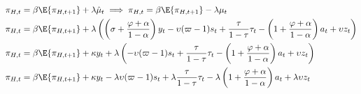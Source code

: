 

\begin{align}
    \pi_{H,t} &= \beta \E \{\pi_{H,t+1}\} + \lambda \hat{\mu}_t \implies \pi_{H,t} = \beta \E \{\pi_{H,t+1}\} - \lambda \mu_t \\
    \pi_{H,t} &= \beta \E \{\pi_{H,t+1}\} + \lambda \left(\left(\sigma + \frac{\varphi + \alpha}{1-\alpha}\right)y_t - \upsilon (\varpi - 1) s_t + \frac{\tau}{1-\tau}\tau_t  - \left(1 + \frac{\varphi + \alpha}{1-\alpha}\right)a_t + \upsilon z_t\right) \\
    \pi_{H,t} &= \beta \E \{\pi_{H,t+1}\} + \kappa y_t + \lambda \left(- \upsilon (\varpi - 1) s_t + \frac{\tau}{1-\tau}\tau_t  - \left(1 + \frac{\varphi + \alpha}{1-\alpha}\right)a_t + \upsilon z_t\right) \\
    \pi_{H,t} &= \beta \E \{\pi_{H,t+1}\} + \kappa y_t - \lambda \upsilon (\varpi - 1) s_t + \lambda\frac{\tau}{1-\tau}\tau_t  - \lambda\left(1 + \frac{\varphi + \alpha}{1-\alpha}\right)a_t + \lambda\upsilon z_t \\
\end{align}
\pagebreak

